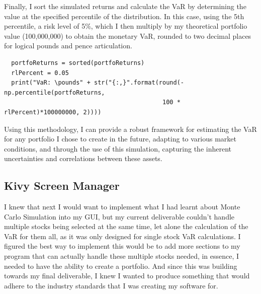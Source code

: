 \documentclass{article}
\begin{document}
\vspace{0.3cm}
Finally, I sort the simulated returns and calculate the VaR by determining the value at the specified percentile of the distribution. In this case, using the 5th percentile, a risk level of 5\%, which I then multiply by my theoretical portfolio value (100,000,000) to obtain the monetary VaR, rounded to two decimal places for logical pounds and pence articulation.\\\vspace{0.3cm}

\begin{verbatim}
  portfoReturns = sorted(portfoReturns)
  rlPercent = 0.05
  print("VaR: \pounds" + str("{:,}".format(round(-np.percentile(portfoReturns, 
                                            100 * rlPercent)*100000000, 2))))
\end{verbatim}

\vspace{0.3cm}
Using this methodology, I can provide a robust framework for estimating the VaR for any portfolio I chose to create in the future, adapting to various market conditions, and through the use of this simulation, capturing the inherent uncertainties and correlations between these assets.


\subsection{Kivy Screen Manager}
I knew that next I would want to implement what I had learnt about Monte Carlo Simulation into my GUI, but my current deliverable couldn't handle multiple stocks being selected at the same time, let alone the calculation of the VaR for them all, as it was only designed for single stock VaR calculations. I figured the best way to implement this would be to add more sections to my program that can actually handle these multiple stocks needed, in essence, I needed to have the ability to create a portfolio. And since this was building towards my final deliverable, I knew I wanted to produce something that would adhere to the industry standards that I was creating my software for.\\\vspace{0.3cm}
\end{document}
